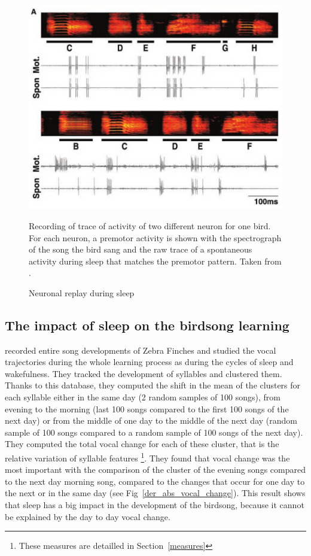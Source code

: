 \documentclass{report}
\begin{document}
\begin{figure}[tbph]
  {\center
  \includegraphics[width=0.7\linewidth]{media/replays_bird_margoliash}
  \caption{Neuronal replay during sleep}
  }
  \small
  Recording of trace of activity of two different neuron for one bird. For each
  neuron, a premotor activity is shown with the spectrograph of the song the
  bird sang and the raw trace of a spontaneous activity during sleep that
  matches the premotor pattern. Taken from \textcite{dave_song_2000}.

\end{figure}

\subsection{The impact of sleep on the birdsong learning}
\label{impact-sleep-birdsong-learning}

\textcite{deregnaucourt_how_2005} recorded entire song developments of Zebra
Finches and studied the vocal trajectories during the whole learning process as
during the cycles of sleep and wakefulness. They tracked the development of
syllables and clustered them. Thanks to this database, they computed the shift
in the mean of the clusters for each syllable either in the same day (2 random
samples of 100 songs), from evening to the morning (last 100 songs compared to
the first 100 songs of the next day) or from the middle of one day to the middle
of the next day (random sample of 100 songs compared to a random sample of 100
songs of the next day). They computed the total vocal change for each of these
cluster, that is the relative variation of syllable features
\textcite{tchernichovski_procedure_2000}\footnote{These measures are detailled
in Section~\ref{measures}}. They found
that vocal change was the most important with the comparison of the cluster of
the evening songs compared to the next day morning song, compared to the changes
that occur for one day to the next or in the same day (see
Fig~\ref{der_abs_vocal_change}). This result shows that sleep has a big impact
in the development of the birdsong, because it cannot be explained by the day to
day vocal change.
\end{document}
